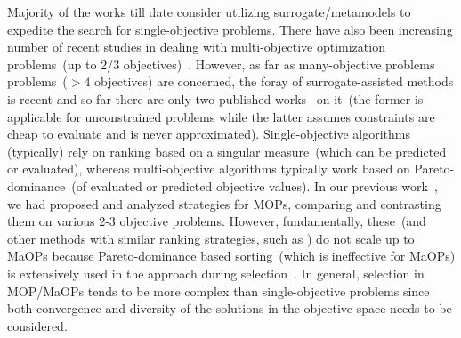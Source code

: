 \begin{enumerate}
	
	{\color{blue}
		\item Majority of the works till date consider utilizing surrogate/metamodels to expedite the search for single-objective problems. There have also been increasing number of recent studies in dealing with multi-objective optimization problems~(up to 2/3 objectives)~\cite{Knowles2008}. However, as far as many-objective problems problems~($>4$ objectives) are concerned, the foray of surrogate-assisted methods is recent and so far there are only two published works~\cite{KHTchugh2016krvea,KHTchugh2016const} on it~(the former is applicable for unconstrained problems while the latter assumes constraints are cheap to evaluate and is never approximated). Single-objective algorithms (typically) rely on ranking based on a singular measure~(which can be predicted or evaluated), whereas multi-objective algorithms typically work based on Pareto-dominance~(of evaluated or predicted objective values). In our previous work~\cite{KHTjmd2016}, we had proposed and analyzed strategies for MOPs, comparing and contrasting them on various 2-3 objective problems. However, fundamentally, these~(and other methods with similar ranking strategies, such as \cite{KHTknowles2006pha}) do not scale up to MaOPs because Pareto-dominance based sorting~(which is ineffective for MaOPs) is extensively used in the approach during selection~\cite{KHTishibuchi2008evolutionary}. In general, selection in MOP/MaOPs tends to be more complex than single-objective problems since both convergence and diversity of the solutions in the objective space needs to be considered.
	}
	
	

\end{enumerate}
